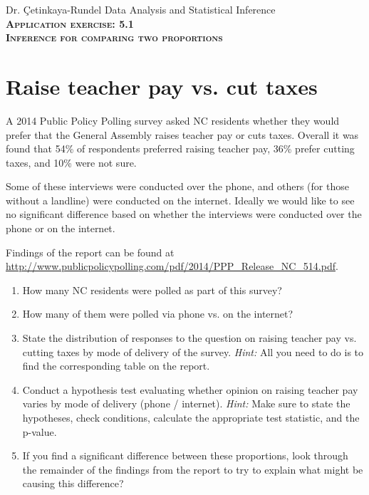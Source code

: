 \documentclass[11pt]{article}
\newcommand{\ttl}[1]{ \textsc{{\LARGE \textbf{{\color{oiB} #1} } }}}
\begin{document}
Dr. \c{C}etinkaya-Rundel \hfill Data Analysis and Statistical Inference \\

\ttl{Application exercise: 5.1 \\
Inference for comparing two proportions}

\section*{Raise teacher pay vs. cut taxes}

A 2014 Public Policy Polling survey asked NC residents whether they would prefer that the General Assembly raises teacher pay or cuts taxes. Overall it was found that 54\% of respondents preferred raising teacher pay, 36\% prefer cutting taxes, and 10\% were not sure. 

Some of these interviews were conducted over the phone, and others (for those without a landline) were conducted on the internet. Ideally we would like to see no significant difference based on whether the interviews were conducted over the phone or on the internet.

Findings of the report can be found at \url{http://www.publicpolicypolling.com/pdf/2014/PPP_Release_NC_514.pdf}.

\begin{enumerate}

\item How many NC residents were polled as part of this survey?

\item How many of them were polled via phone vs. on the internet?

\item State the distribution of responses to the question on raising teacher pay vs. cutting taxes by mode of delivery of the survey. \textit{Hint:} All you need to do is to find the corresponding table on the report.

\item Conduct a hypothesis test evaluating whether opinion on raising teacher pay varies by mode of delivery (phone / internet). \textit{Hint:} Make sure to state the hypotheses, check conditions, calculate the appropriate test statistic, and the p-value.

\item If you find a significant difference between these proportions, look through the remainder of the findings from the report to try to explain what might be causing this difference?

\end{enumerate}

%
\end{document}
